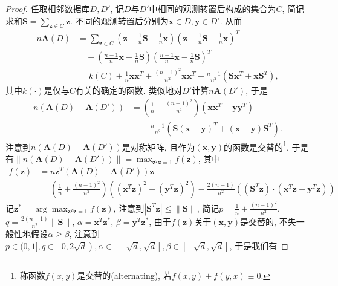 \begin{proof}
  任取相邻数据库$D, D'$, 记$D$与$D'$中相同的观测转置后构成的集合为$C$, 简记求和$\mathbf{S} = \sum_{\mathbf{z}\in C} \mathbf{z}$. 不同的观测转置后分别为$\mathbf{x}\in D, \mathbf{y}\in D'$. 从而
  \begin{align*}
    n \mathbf{A}(D) &= \sum_{\mathbf{z}\in C} \left(\mathbf{z} - \frac{1}{n}\mathbf{S} - \frac{1}{n}\mathbf{x}\right)\left(\mathbf{z} - \frac{1}{n}\mathbf{S} - \frac{1}{n}\mathbf{x}\right)^T \\
    &\quad + \left(\frac{n-1}{n}\mathbf{x} - \frac{1}{n}\mathbf{S}\right)\left(\frac{n-1}{n}\mathbf{x} - \frac{1}{n}\mathbf{S}\right)^T \\
    &= k(C) + \frac{1}{n}\mathbf{x}\mathbf{x}^T + \frac{(n-1)^2}{n^2}\mathbf{x}\mathbf{x}^T - \frac{n-1}{n^2}\left(\mathbf{S} \mathbf{x}^T + \mathbf{x} \mathbf{S}^T\right),
  \end{align*}
  其中$k(\cdot)$是仅与$C$有关的确定的函数. 类似地对$D'$计算$n\mathbf{A}(D')$, 于是
  \begin{align*}
    n(\mathbf{A}(D) - \mathbf{A}(D')) &= \left(\frac{1}{n} + \frac{(n-1)^2}{n^2}\right)(\mathbf{x}\mathbf{x}^T - \mathbf{y}\mathbf{y}^T) \\
    &\quad - \frac{n-1}{n^2}\left(\mathbf{S}(\mathbf{x} - \mathbf{y})^T + (\mathbf{x} - \mathbf{y})\mathbf{S}^T\right).
  \end{align*}
  注意到$n(\mathbf{A}(D) - \mathbf{A}(D'))$是对称矩阵, 且作为$(\mathbf{x}, \mathbf{y})$的函数是交替的\footnote{称函数$f(x, y)$是交替的(alternating), 若$f(x, y) + f(y, x) \equiv 0$.}, 于是有$\|n(\mathbf{A}(D) - \mathbf{A}(D'))\| = \max_{\mathbf{z}^T\mathbf{z} = 1} f(\mathbf{z})$, 其中
  \begin{align*}
    f(\mathbf{z}) &= n\mathbf{z}^T (\mathbf{A}(D) - \mathbf{A}(D'))\mathbf{z} \\
    &=\left(\frac{1}{n} + \frac{(n-1)^2}{n^2}\right)\left(\left(\mathbf{x}^T\mathbf{z}\right)^2 - \left(\mathbf{y}^T\mathbf{z}\right)^2\right) - \frac{2(n-1)}{n^2}\left(\left(\mathbf{S}^T\mathbf{z}\right)\cdot \left(\mathbf{x}^T\mathbf{z} - \mathbf{y}^T\mathbf{z}\right)\right) 
  \end{align*}
  记$\mathbf{z}^* = \arg\max_{\mathbf{z}^T\mathbf{z} = 1} f(\mathbf{z})$, 注意到$|\mathbf{S}^T\mathbf{z}| \le \|\mathbf{S}\|$, 简记$p = \frac{1}{n} + \frac{(n-1)^2}{n^2}$, $q = \frac{2(n-1)}{n^2}\|\mathbf{S}\|$, $\alpha = \mathbf{x}^T\mathbf{z}^*$, $\beta = \mathbf{y}^T\mathbf{z}^*$, 由于$f(\mathbf{z})$关于$(\mathbf{x}, \mathbf{y})$是交替的, 不失一般性地假设$\alpha \ge \beta$, 注意到$p\in(0, 1], q\in\left[0, 2\sqrt{d}\right), \alpha\in\left[-\sqrt{d}, \sqrt{d}\right], \beta\in\left[-\sqrt{d}, \sqrt{d}\right]$, 于是我们有

\end{proof}
